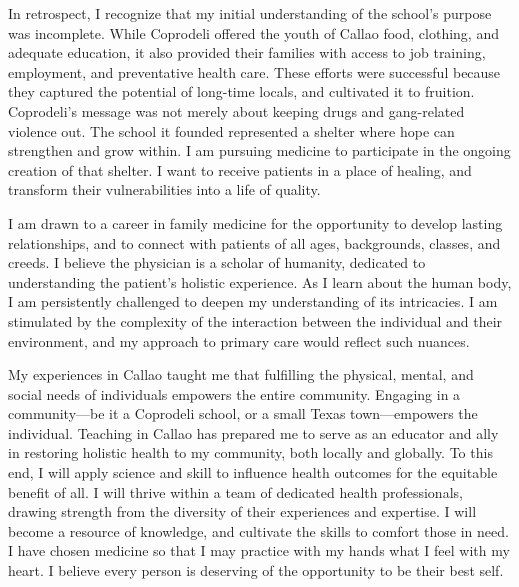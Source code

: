 \documentclass[12pt,a4paper,roman]{moderncv} %
\begin{document}
\medskip

In retrospect, I recognize that my initial understanding of the school's purpose was incomplete. While Coprodeli offered the youth of Callao food, clothing, and adequate education, it also provided their families with access to job training, employment, and preventative health care. These efforts were successful because they captured the potential of long-time locals, and cultivated it to fruition. Coprodeli's message was not merely about keeping drugs and gang-related violence out. The school it founded represented a shelter where hope can strengthen and grow within. I am pursuing medicine to participate in the ongoing creation of that shelter. I want to receive patients in a place of healing, and transform their vulnerabilities into a life of quality.

\medskip

I am drawn to a career in family medicine for the opportunity to develop lasting relationships, and to connect with patients of all ages, backgrounds, classes, and creeds. I believe the physician is a scholar of humanity, dedicated to understanding the patient's holistic experience. As I learn about the human body, I am persistently challenged to deepen my understanding of its intricacies. I am stimulated by the complexity of the interaction between the individual and their environment, and my approach to primary care would reflect such nuances. 

\medskip

My experiences in Callao taught me that fulfilling the physical, mental, and social needs of individuals empowers the entire community. Engaging in a community---be it a Coprodeli school, or a small Texas town---empowers the individual. Teaching in Callao has prepared me to serve as an educator and ally in restoring holistic health to my community, both locally and globally. To this end, I will apply science and skill to influence health outcomes for the equitable benefit of all. I will thrive within a team of dedicated health professionals, drawing strength from the diversity of their experiences and expertise. I will become a resource of knowledge, and cultivate the skills to comfort those in need. I have chosen medicine so that I may practice with my hands what I feel with my heart. I believe every person is deserving of the opportunity to be their best self. 
\end{document}
